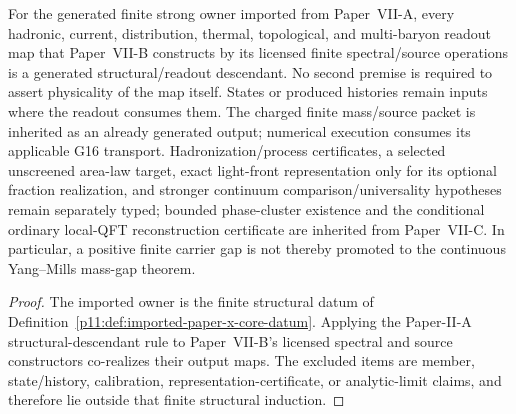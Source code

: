 \documentclass[12pt,a4paper]{article}
\begin{document}
\begin{corollary}
\label{p11:cor:v147-generated-readout-descendants}
For the generated finite strong owner imported from Paper~VII-A, every hadronic,
current, distribution, thermal, topological, and multi-baryon readout map that
Paper~VII-B constructs by its licensed finite spectral/source operations is a
generated structural/readout descendant.  No second premise is required to
assert physicality of the map itself.  States or produced histories remain inputs where the readout consumes them.
The charged finite mass/source packet is inherited as an already generated
output; numerical execution consumes its applicable G16 transport.
Hadronization/process certificates, a selected unscreened area-law target,
exact light-front representation only for its optional fraction realization,
and stronger continuum comparison/universality hypotheses remain separately typed; bounded phase-cluster existence and the conditional ordinary local-QFT
reconstruction certificate are inherited from Paper~VII-C.  In particular, a
positive finite carrier gap is not thereby promoted to the continuous
Yang--Mills mass-gap theorem.
\end{corollary}
\begin{proof}
The imported owner is the finite structural datum of
Definition~\ref{p11:def:imported-paper-x-core-datum}.  Applying the Paper-II-A
structural-descendant rule to Paper~VII-B's licensed spectral and source
constructors co-realizes their output maps.  The excluded items are member,
state/history, calibration, representation-certificate, or analytic-limit
claims, and therefore lie outside that finite structural induction.
\end{proof}
\end{document}
